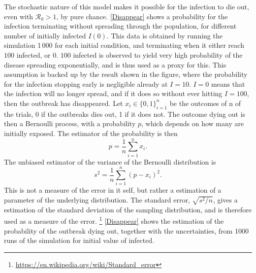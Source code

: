 \documentclass{article}
\begin{document}
    The stochastic nature of this model makes it possible for the infection to die out, even with $\mathcal{R}_0>1$, by pure chance. 
    \autoref{Disappear} shows a probability for the infection terminating without spreading through the population, for different number of initially infected $I(0)$.
    This data is obtained by running the simulation 1\,000 for each initial condition, and terminating when it either reach $100$ infected, or $0$.
    $100$ infected is observed to yield very high probability of the disease spreading exponentially, and is thus used as a proxy for this.
    This assumption is backed up by the result shown in the figure, where the probability for the infection stopping early is negligible already at $I=10$. 
    $I=0$ means that the infection will no longer spread, and if it does so without ever hitting $I=100$, then the outbreak has disappeared.
    Let $x_i\in\{0, 1\}_{i=1}^n$ be the outcomes of n of the trials, 0 if the outbreaks dies out, 1 if it does not.
    The outcome dying out is then a Bernoulli process, with a probability $p$, which depends on how many are initially exposed.
    The estimator of the probability is then
    \begin{equation*}
        p = \frac{1}{n}\sum_{i=1}^n x_i.
    \end{equation*}
    The unbiased estimator of the variance of the Bernoulli distribution is
    \begin{equation*}
        s^2 = \frac{1}{n} \sum_{i=1}^n (p - x_i)^2.
    \end{equation*}
    This is not a measure of the error in it self, but rather a estimation of a parameter of the underlying distribution. 
    The standard error, $\sqrt{s^2/n}$, gives a estimation of the standard deviation of the sampling distribution, and is therefore used as a measure of the error. \footnote{\url{https://en.wikipedia.org/wiki/Standard_error}}
    \autoref{Disappear} shows the estimation of the probability of the outbreak dying out, together with the uncertainties, from 1000 runs of the simulation for initial value of infected.
\end{document}

